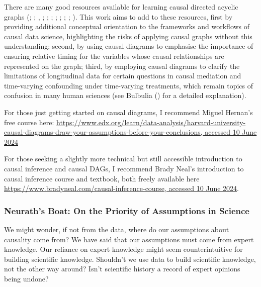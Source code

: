 \documentclass[
  single column]{article}
\begin{document}
There are many good resources available for learning causal directed
acyclic graphs (;
;
,
;
;
;
;
;
;
;
). This work aims to add
to these resources, first by providing additional conceptual orientation
to the frameworks and workflows of causal data science, highlighting the
risks of applying causal graphs without this understanding; second, by
using causal diagrams to emphasise the importance of ensuring relative
timing for the variables whose causal relationships are represented on
the graph; third, by employing causal diagrams to clarify the
limitations of longitudinal data for certain questions in causal
mediation and time-varying confounding under time-varying treatments,
which remain topics of confusion in many human sciences (see Bulbulia
() for a detailed
explanation).

For those just getting started on causal diagrams, I recommend Miguel
Hernan's free course here:
\href{https://www.edx.org/learn/data-analysis/harvard-university-causal-diagrams-draw-your-assumptions-before-your-conclusions}{https://www.edx.org/learn/data-analysis/harvard-university-causal-diagrams-draw-your-assumptions-before-your-conclusions,
accessed 10 June 2024}

For those seeking a slightly more technical but still accessible
introduction to causal inference and causal DAGs, I recommend Brady
Neal's introduction to causal inference course and textbook, both freely
available here
\href{https://www.bradyneal.com/causal-inference-course}{https://www.bradyneal.com/causal-inference-course,
accessed 10 June 2024}.

\subsubsection{Neurath's Boat: On the Priority of Assumptions in
Science}\label{neuraths-boat-on-the-priority-of-assumptions-in-science}

We might wonder, if not from the data, where do our assumptions about
causality come from? We have said that our assumptions must come from
expert knowledge. Our reliance on expert knowledge might seem
counterintuitive for building scientific knowledge. Shouldn't we use
data to build scientific knowledge, not the other way around? Isn't
scientific history a record of expert opinions being undone?
\end{document}
